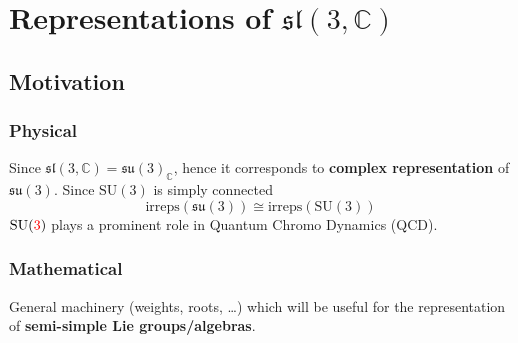 \documentclass[../main.tex]{subfiles}
\begin{document}
\setchapterpreamble[u]{\margintoc}
\chapter[Representations of $\mathfrak{sl}(3,\mathbb{C})$]{Representations of $\mathfrak{sl}(3,\mathbb{C})$\footnotemark[0]}
\section{Motivation}
\subsection{Physical} 
Since $\mathfrak{sl}(3,\mathbb{C})=\mathfrak{su}(3)_{\mathbb{C}}$, hence it corresponds to \textbf{complex representation} of $\mathfrak{su}(3)$. Since $\text{SU}(3)$ is simply connected
\[
\text{irreps}(\mathfrak{su}(3))\cong\textrm{irreps}(\textrm{SU}(3))
\]
$\textrm{SU}({\color{red}3})$ plays a prominent role in Quantum Chromo Dynamics (QCD).
\subsection{Mathematical}
General machinery (weights, roots, \dots) which will be useful for the representation of \textbf{semi-simple Lie groups/algebras}.
\end{document}
